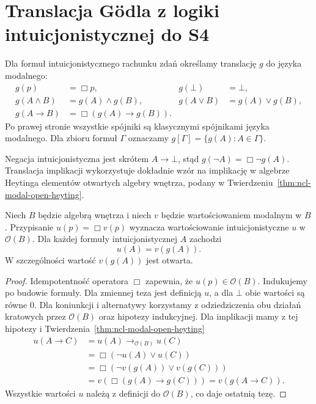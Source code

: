 \section{Translacja Gödla z logiki intuicjonistycznej do S4}

\begin{definicja}
\label{def:ncl-modal-goedel-translation}
Dla formuł intuicjonistycznego rachunku zdań
określamy translację $g$ do języka modalnego:
\[
\begin{aligned}
 g(p)&=\Box p,& g(\bot)&=\bot,\\
 g(A\wedge B)&=g(A)\wedge g(B),&
 g(A\vee B)&=g(A)\vee g(B),\\
 g(A\to B)&=\Box(g(A)\to g(B)).
\end{aligned}
\]
Po prawej stronie wszystkie spójniki są
klasycznymi spójnikami języka modalnego.
Dla zbioru formuł $\Gamma$ oznaczamy
$g[\Gamma]=\{g(A):A\in\Gamma\}$.
\end{definicja}
Negacja intuicjonistyczna jest skrótem $A\to\bot$,
stąd $g(\neg A)=\Box\neg g(A)$.
Translacja implikacji wykorzystuje dokładnie
wzór na implikację w algebrze Heytinga elementów
otwartych algebry wnętrza, podany w
Twierdzeniu~\ref{thm:ncl-modal-open-heyting}.

\begin{lemat}
\label{lem:ncl-modal-goedel-valuation}
Niech $B$ będzie algebrą wnętrza i niech $v$
będzie wartościowaniem modalnym w $B$.
Przypisanie $u(p)=\Box v(p)$ wyznacza
wartościowanie intuicjonistyczne $u$ w
$\mathcal O(B)$. Dla każdej formuły
intuicjonistycznej $A$ zachodzi
\[
 u(A)=v(g(A)).
\]
W szczególności wartość $v(g(A))$ jest otwarta.
\end{lemat}
\begin{proof}
Idempotentność operatora $\Box$ zapewnia,
że $u(p)\in\mathcal O(B)$.
Indukujemy po budowie formuły.
Dla zmiennej teza jest definicją $u$,
a dla $\bot$ obie wartości są równe $0$.
Dla koniunkcji i alternatywy korzystamy
z odziedziczenia obu działań kratowych
przez $\mathcal O(B)$ oraz hipotezy indukcyjnej.
Dla implikacji mamy z tej hipotezy
i Twierdzenia~\ref{thm:ncl-modal-open-heyting}
\[
\begin{aligned}
 u(A\to C)
 &=u(A)\to_{\mathcal O(B)}u(C)\\
 &=\Box(\neg u(A)\vee u(C))\\
 &=\Box(\neg v(g(A))\vee v(g(C)))\\
 &=v(\Box(g(A)\to g(C)))=v(g(A\to C)).
\end{aligned}
\]
Wszystkie wartości $u$ należą z definicji
do $\mathcal O(B)$, co daje ostatnią tezę.
\end{proof}

